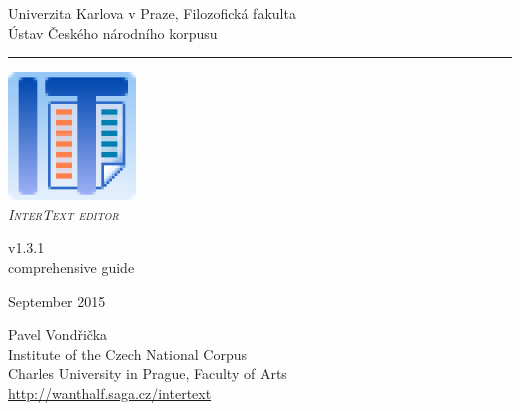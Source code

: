 \documentclass[a4paper,10pt,oneside]{book}
\newcommand{\ITeditor}{\textit{\textsc{InterText editor}}\xspace}
\begin{document}
\begin{titlepage}
\begin{center}

\begin{Large}
Univerzita Karlova v Praze, Filozofická fakulta \\
Ústav Českého národního korpusu
\end{Large}
\rule{\linewidth}{0.5mm}

\vspace*{4cm}

\begin{Huge}
\includegraphics[width=4ex]{icon.png}\\
\vspace*{1cm}
\ITeditor
\end{Huge}

\begin{huge}
v1.3.1\\
\medskip
comprehensive guide
\end{huge}
\bigskip

\begin{Large}
September 2015\\
\end{Large}



\bigskip

\vspace*{2.5cm}

\begin{Large}
Pavel Vondřička\\
Institute of the Czech National Corpus\\
Charles University in Prague, Faculty of Arts\\
\bigskip
\url{http://wanthalf.saga.cz/intertext}
\end{Large}

\end{center}

\end{titlepage}
\thispagestyle{empty}
\end{document}
